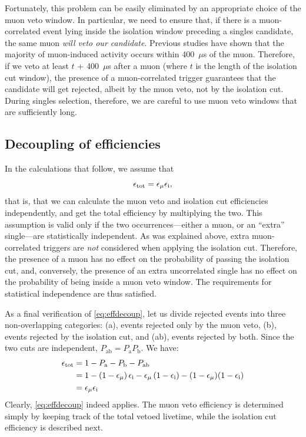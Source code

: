 \documentclass[../thesis.tex]{subfiles}
\begin{document}
Fortunately, this problem can be easily eliminated by an appropriate choice of
the muon veto window. In particular, we need to ensure that, if there is a
muon-correlated event lying inside the isolation window preceding a singles
candidate, the same muon \emph{will veto our candidate}. Previous studies have
shown that the majority of muon-induced activity occurs within 400~$\mu$s of the
muon. Therefore, if we veto at least $t$ + 400~$\mu$s after a muon (where $t$ is
the length of the isolation cut window), the presence of a muon-correlated
trigger guarantees that the candidate will get rejected, albeit by the muon
veto, not by the isolation cut. During singles selection, therefore, we are
careful to use muon veto windows that are sufficiently long.

\subsection{Decoupling of efficiencies}
\label{sec:effdecoup}

\def\Pa{\ensuremath{P_\mathrm{a}}} \def\Pb{\ensuremath{P_\mathrm{b}}}
\def\Pab{\ensuremath{P_\mathrm{ab}}}

In the calculations that follow, we assume that
\begin{equation}
  \label{eq:effdecoup}
  \epsilon_\mathrm{tot} = \epsilon_\mathrm{\mu} \epsilon_\mathrm{i},
\end{equation}
that is, that we can calculate the muon veto and isolation cut efficiencies
independently, and get the total efficiency by multiplying the two. This
assumption is valid only if the two occurrences---either a muon, or an ``extra''
single---are statistically independent. As was explained above, extra
muon-correlated triggers are \emph{not} considered when applying the isolation
cut. Therefore, the presence of a muon has no effect on the probability of
passing the isolation cut, and, conversely, the presence of an extra
uncorrelated single has no effect on the probability of being inside a muon veto
window. The requirements for statistical independence are thus satisfied.

As a final verification of \eqref{eq:effdecoup}, let us divide rejected events
into three non-overlapping categories: (a), events rejected only by the muon
veto, (b), events rejected by the isolation cut, and (ab), events rejected by
both. Since the two cuts are independent, $\Pab = \Pa\Pb$. We have:
\begin{align*}
  \etot &= 1 - \Pa - \Pb - \Pab \\
        &= 1 - (1-\emu)\,\eisol - \emu\,(1-\eisol) - (1-\emu)(1-\eisol) \\
        &= \emu \eisol
\end{align*}
Clearly, \eqref{eq:effdecoup} indeed applies. The muon veto efficiency is
determined simply by keeping track of the total vetoed livetime, while the
isolation cut efficiency is described next.
\end{document}
